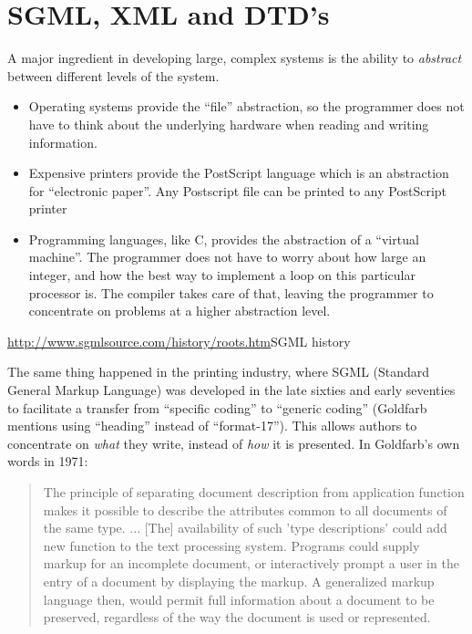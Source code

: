 
\chapter{SGML, XML and DTD's}

A major ingredient in developing large, complex systems is the ability
to \textit{abstract} between different levels of the system.

\begin{itemize}
\item Operating systems provide the ``file'' abstraction, so the
  programmer does not have to think about the underlying hardware when
  reading and writing information.
\item Expensive printers provide the PostScript language which is an
  abstraction for ``electronic paper''.  Any Postscript file can be
  printed to any PostScript printer
\item Programming languages, like C, provides the abstraction of a
  ``virtual machine''.  The programmer does not have to worry about
  how large an integer, and how the best way to implement a loop on
  this particular processor is.  The compiler takes care of that,
  leaving the programmer to concentrate on problems at a higher
  abstraction level.
\end{itemize}

\url{http://www.sgmlsource.com/history/roots.htm}{SGML history}

The same thing happened in the printing industry, where SGML (Standard
General Markup Language) was developed in the late sixties and early
seventies to facilitate a transfer from ``specific coding'' to
``generic coding'' (Goldfarb mentions using ``heading'' instead of
``format-17'').  This allows authors to concentrate on \textit{what}
they write, instead of \textit{how} it is presented.  In Goldfarb's
own words in 1971:

\begin{quote}
  The principle of separating document description from application
  function makes it possible to describe the attributes common to all
  documents of the same type. ... [The] availability of such 'type
  descriptions' could add new function to the text processing system.
  Programs could supply markup for an incomplete document, or
  interactively prompt a user in the entry of a document by displaying
  the markup. A generalized markup language then, would permit full
  information about a document to be preserved, regardless of the way
  the document is used or represented.
\end{quote}

